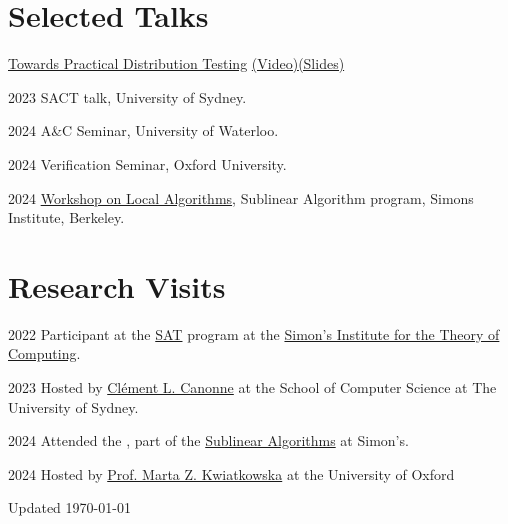 \documentclass[12pt,letterpaper]{report}
\begin{document}
	\section*{Selected Talks}
	\begin{tablist}
		\item[\underline{Towards Practical Distribution Testing}   \href{https://www.youtube.com/live/LexsPa-iGA4?si=b_wZrOyOpPlYB9VR}{(Video)}\href{https://simons.berkeley.edu/sites/default/files/2024-08/Yash\%20Pote_WOLA\%20Slides.pdf}{(Slides)}] 
		
		\item[2023]	SACT talk, University of Sydney. 
		
		\item[2024] A\&C Seminar, University of Waterloo.
		
		\item[2024]	Verification Seminar, Oxford University.
				
		\item[2024]	\href{https://simons.berkeley.edu/workshops/workshop-local-algorithms-wola}{Workshop on Local Algorithms}, Sublinear Algorithm program, Simons Institute, Berkeley.	
	\end{tablist}
	
		\section*{Research Visits}
	\begin{tablist}
		\item[2022]
	     Participant at the \href{https://simons.berkeley.edu/programs/sat2021}{SAT} program at the \href{https://simons.berkeley.edu/}{Simon's Institute for the Theory of Computing}.
		
		\item[2023]
		 Hosted by \href{https://ccanonne.github.io/}{Clément L. Canonne} at the School of Computer Science at The University of Sydney. 
		
		\item[2024]
		Attended the  , part of the  \href{https://simons.berkeley.edu/programs/sublinear-algorithms/}{Sublinear Algorithms} at Simon's.
		
		\item[2024]	Hosted by  \href{https://ccanonne.github.io/}{Prof. Marta Z. Kwiatkowska} at the University of Oxford
	\end{tablist}
	
	
	\begin{center}
		\vfill
		Updated \monthyeardate\today
	\end{center}
	
\end{document}
